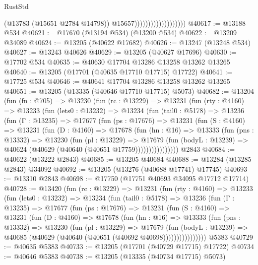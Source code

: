 \begin{lexlean}{RustStd}
\begin{coremodule}
                                          (@13783 (@15651 @2784 @14798))
                                          @15657)))))))))))))))))))
@40617 := @13188 @534
@40621 := @17670 (@13194 @534) (@13200 @534)
@40622 := @13209 @34089
@40624 := @13205 (@40622 @17682)
@40626 := @13247 (@13248 @534)
@40627 := @13243 @40626
@40629 := @13205 (@40627 @17696)
@40630 := @17702 @534
@40635 := @40630 @17704 @13286 @13258 @13262 @13265
@40640 := @13205 (@17701 (@40635 @17710 @17715) @17722)
@40641 := @17725 @534
@40646 := @40641 @17704 @13286 @13258 @13262 @13265
@40651 := @13205 (@13335 (@40646 @17710 @17715) @5073)
@40682 := @13204
    (fun (fn : @705) =>
    @13230
      (fun (rc : @13229) =>
      @13231
        (fun (rty : @4160) =>
        @13233
          (fun (lets0 : @13232) =>
          @13234
            (fun (tail0 : @5178) =>
            @13236
              (fun (Γ : @13235) =>
              @17677
                (fun (ps : @17676) =>
                @13231
                  (fun (S : @4160) =>
                  @13231
                    (fun (D : @4160) =>
                    @17678
                      (fun (hn : @16) =>
                      @13333
                        (fun (pns : @13332) =>
                        @13230
                          (fun (pl : @13229) =>
                          @17679
                            (fun (bodyL : @13239) =>
                            @40624 (@40629 (@40640 (@40651 @17759))))))))))))))))
    @2843
@40684 := @40622 (@13222 @2843)
@40685 := @13205 @40684
@40688 := @13284 (@13285 @2843) @34092
@40692 := @13205 (@13276 (@40688 @17741) @17745)
@40693 := @13310 @2843
@40698 := @17750 (@17751 @40693 @34095 @17712 @17714)
@40728 := @13420
    (fun (rc : @13229) =>
    @13231
      (fun (rty : @4160) =>
      @13233
        (fun (lets0 : @13232) =>
        @13234
          (fun (tail0 : @5178) =>
          @13236
            (fun (Γ : @13235) =>
            @17677
              (fun (ps : @17676) =>
              @13231
                (fun (S : @4160) =>
                @13231
                  (fun (D : @4160) =>
                  @17678
                    (fun (hn : @16) =>
                    @13333
                      (fun (pns : @13332) =>
                      @13230
                        (fun (pl : @13229) =>
                        @17679
                          (fun (bodyL : @13239) =>
                          @40685 (@40629 (@40640 (@40651 (@40692 @40698))))))))))))))))
    @5383
@40729 := @40635 @5383
@40733 := @13205 (@17701 (@40729 @17715) @17722)
@40734 := @40646 @5383
@40738 := @13205 (@13335 (@40734 @17715) @5073)

\end{coremodule}
\end{lexlean}

